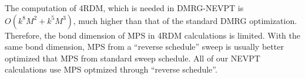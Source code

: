 The computation of 4RDM, which is needed in DMRG-NEVPT is $O(k^8M^2+k^5M^3)$, much higher than that of the standard DMRG optimization. Therefore, the bond dimension of MPS in 4RDM calculations is limited. With the same bond dimension, MPS from a ``reverse schedule'' sweep is usually better optimized that MPS from standard sweep schedule.\cite{olivares-amaya_ab-initio_2015} All of our NEVPT calculations use MPS optmized through ``reverse schedule''.

%
%
%
%
%
%
